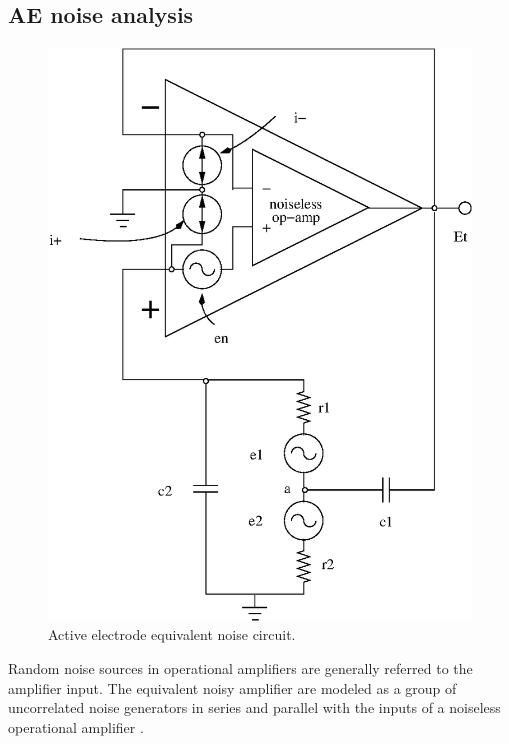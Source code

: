 \subsection{AE noise analysis}
\label{section:noise-analyses}
\begin{figure}[htbp]
	\begin{center}
	\includegraphics{ae-noise-eq.eps}
	\caption{Active electrode equivalent noise circuit.}
	\label{fig:ae-noise-eq}
	\end{center}
\end{figure}

Random noise sources in operational amplifiers are generally referred
to the amplifier input. The equivalent noisy amplifier are modeled as
a group of uncorrelated noise generators in series and parallel with
the inputs of a noiseless operational amplifier
\cite[11]{noise-analysis}. 

